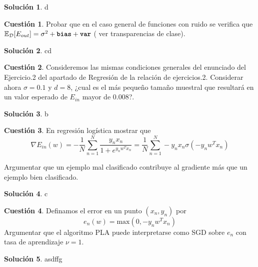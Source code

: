 \documentclass[a4paper, 11pt]{article}
\theoremstyle{definition}
\newtheorem{cuestion}{Cuestión}
\newtheorem*{solucion}{Solución}
\begin{document}
  \begin{solucion}
    d
  \end{solucion}

  \begin{cuestion}
    Probar que en el caso general de funciones con ruido se verifica que $\mathbb{E}_{\mathcal{D}}[E_{out}]= \sigma^2+\texttt{\textbf{bias}}+\texttt{\textbf{var}}$ ( ver transparencias de clase).

  \end{cuestion}

  \begin{solucion}
    cd
  \end{solucion}

  \begin{cuestion}
    \item  Consideremos las mismas condiciones generales del enunciado del Ejercicio.2 del apartado de Regresión de la relación de ejercicios.2.
    Considerar ahora $\sigma=0.1$ y $d=8$, ¿cual es el más pequeño tamaño muestral que resultará en un valor esperado de $E_{in}$ mayor de $0.008$?.
  \end{cuestion}


  \begin{solucion}
    b
  \end{solucion}

  \begin{cuestion}
    En regresión logística mostrar que
    \[
    \nabla E_{in}(w)=-\frac{1}{N}\sum_{n=1}^{N}\frac{y_nx_n}{1+e^{y_nw^Tx_n}}= \frac{1}{N}\sum_{n=1}^{N}-y_nx_n\sigma(-y_nw^Tx_n)
    \]

    Argumentar que un ejemplo mal clasificado contribuye  al gradiente más que un ejemplo bien clasificado.
  \end{cuestion}

  \begin{solucion}
    c
  \end{solucion}

  \begin{cuestion}
    Definamos el error en un punto $(x_n,y_n)$ por
      \[
      e_n(w)=\text{max}(0,-y_nw^Tx_n)
      \]
      Argumentar que el algoritmo PLA puede interpretarse como SGD sobre $e_n$ con tasa de aprendizaje $\nu=1$.
  \end{cuestion}

  \begin{solucion}
    asdffg
  \end{solucion}
\end{document}
